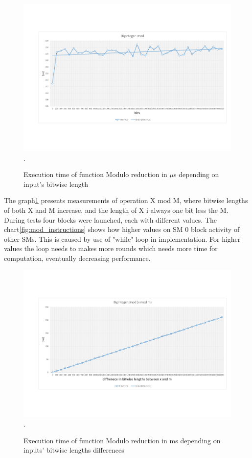 \documentclass[oneside,openright,12pt,final,en]{mgr}
\begin{document}
\begin{figure}[H]
	\centering
	\includegraphics[width=\textwidth,trim={0.5cm 2.8cm 0.4cm 2.8cm},clip]{mod.pdf}.
	\caption{Execution time of function Modulo reduction in $\mu$s depending on input's bitwise length}
	\label{fig:mod}
\end{figure}

The graph\ref{fig:mod} presents measurements of operation X mod M, where bitwise lengths of both X and M increase, and the length of X i always one bit less the M. During tests four blocks were launched, each with different values. The chart\ref{fig:mod_instructions} shows how higher values on SM 0 block activity of other SMs. This is caused by use of "while" loop in implementation. For higher values the loop needs to makes more rounds which needs more time for computation, eventually decreasing performance. 

\begin{figure}[H]
	\centering
	\includegraphics[width=\textwidth,trim={0.5cm 2.8cm 0.4cm 2.8cm},clip]{mod_diff.pdf}.
	\caption{Execution time of function Modulo reduction in ms depending on inputs' bitwise lengths differences}
	\label{fig:mod_diff}
\end{figure}
\end{document}

